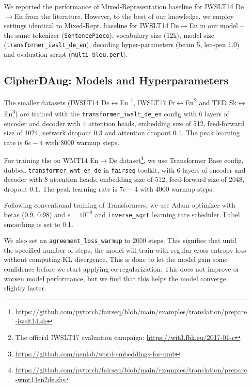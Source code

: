 \documentclass[11pt]{article}
\begin{document}
We reported the performance of Mixed-Representation \cite{pmlr-v119-wu20e} baseline for IWSLT14 De$\rightarrow$En from the literature. However, to the best of our knowledge, we employ settings identical to Mixed-Repr. baseline for IWSLT14 De$\rightarrow$En in our model -- the same tokenizer (\texttt{SentencePiece}), vocabulary size (12k), model size (\texttt{transformer\_iwslt\_de\_en}), decoding hyper-parameters (beam 5, len-pen 1.0) and evaluation script (\texttt{multi-bleu.perl}).




\subsection{CipherDAug: Models and Hyperparameters}
\label{sec:modelhyper}
The smaller datasets (IWSLT14 De$\leftrightarrow$En \footnote{\url{https://github.com/pytorch/fairseq/blob/main/examples/translation/prepare-iwslt14.sh}}, IWSLT17 Fr$\leftrightarrow$En\footnote{The official IWSLT17 evaluation campaign: \url{https://wit3.fbk.eu/2017-01-c}} and TED Sk$\leftrightarrow$En\footnote{\url{https://github.com/neulab/word-embeddings-for-nmt}}) are trained with the \texttt{transformer\_iwslt\_de\_en} config with 6 layers of encoder and decoder with 4 attention heads, embedding size of 512, feed-forward size of 1024, network dropout 0.3 and attention dropout 0.1. The peak learning rate is $6e-4$ with 8000 warmup steps.

For training the on WMT14 En$\rightarrow$De dataset\footnote{\url{https://github.com/pytorch/fairseq/blob/main/examples/translation/prepare-wmt14en2de.sh}}, we use Transformer Base config, dubbed \texttt{transformer\_wmt\_en\_de} in \texttt{fairseq} toolkit, with 6 layers of encoder and decoder with 8 attention heads, embedding size of 512, feed-forward size of 2048, dropout 0.1. The peak learning rate is $7e-4$ with 4000 warmup steps.  


Following conventional training of Transformers, we use Adam optimizer with betas (0.9, 0.98) and $\epsilon = 10^{-9}$ and \texttt{inverse\_sqrt} learning rate scheduler. Label smoothing is set to 0.1. 

We also set an \texttt{agreement\_loss\_warmup} to 2000 steps. This signifies that until the specified number of steps, the model will train with regular cross-entropy loss without computing KL divergence. This is done to let the model gain some confidence before we start applying co-regularization. This does not improve or worsen model performance, but we find that this helps the model converge slightly faster.
\end{document}
